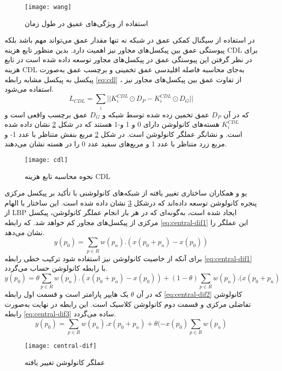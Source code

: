 \begin{figure}[h]
	\centerline{\texttt{[image: wang]}}
	\caption{استفاده از ویژگی‌های عمیق در طول زمان \cite{wang2018exploiting}}
	\label{fig:wang}
\end{figure}
در استفاده از سیگنال کمکی عمق در شبکه نه تنها مقدار عمق می‌تواند مهم باشد بلکه پیوستگی عمق بین پیکسل‌های مجاور نیز اهمیت دارد. بدین منظور تابع هزینه CDL برای در نظر گرفتن این پیوستگی عمق در پیکسل‌های مجاور توسعه داده شده است
\cite{wang2020deep,wang2018exploiting}
در تابع هزینه CDL به‌جای محاسبه فاصله اقلیدسی عمق تخمینی و برچسب عمق به‌صورت پیکسل به پیکسل مشابه رابطه
\ref{eq:cdl}
، از تفاوت عمق بین پیکسل‌های مجاور نیز استفاده می‌شود.
\begin{equation}\label{eq:cdl}
	L_{CDL} = \sum_{i}||K_i^{CDL} \odot D_P-K_i^{CDL} \odot D_G||
\end{equation}
که در آن
$D_P$
عمق تخمین زده شده توسط شبکه و
$D_G$
عمق برچسب واقعی است و
$K_i^{CDL}$
هسته‌های کانولوشن دارای 0 و 1 و-1 هستند که در شکل
\ref{fig:cdl}
نشان داده شده است. و  نشانگر عملگر کانولوشن است. در شکل
\ref{fig:cdl}
مربع بنفش متناظر با عدد 1- و مربع زرد متناظر با عدد 1 و مربع‌های سفید عدد 0 را در هسته نشان می‌دهند. 
 \begin{figure}[ht]
 	\centerline{\texttt{[image: cdl]}}
 	\caption{نحوه محاسبه تابع هزینه CDL}
 	\label{fig:cdl}
 \end{figure}
یو و همکاران
\cite{yu2020searching}
ساختاری تغییر یافته از شبکه‌های کانولوشنی با تأکید بر پیکسل مرکزی پنجره کانولوشن توسعه داده‌اند که درشکل
\ref{fig:central-dif}
نشان داده شده است.
این ساختار با الهام از LBP ایجاد شده است، به‌گونه‌ای که در هر بار انجام عملگر کانولوشن، پیکسل مرکزی از پیکسل‌های مجاور کم خواهد شد. که رابطه
\ref{eq:central-dif1}
این عملگر را نشان می‌دهد.
\begin{equation}\label{eq:central-dif1}
	y(p_0) = \sum_{p \in R} w(p_n).(x(p_0+p_n)-x(p_0)) 
\end{equation}
برای آنکه از خاصیت کانولوشن نیز استفاده شود ترکیب خطی رابطه
\ref{eq:central-dif1}
با رابطه کانولوشن حساب می‌گردد.
\begin{equation}\label{eq:central-dif2}
	y(p_0) = \theta\sum_{p \in R} w(p_n).(x(p_0+p_n)-x(p_0)) +
	(1-\theta)\sum_{p \in R}w(p_n).(x(p_0+p_n)
\end{equation}
که در آن
$\theta$
یک هایپر پارامتر است و قسمت اول رابطه
\ref{eq:central-dif2}
کانولوشن تفاضلی مرکزی و قسمت دوم کانولوشن کلاسیک است. این رابطه در نهایت به‌صورت رابطه
\ref{eq:central-dif3}
ساده می‌گردد.
\begin{equation}\label{eq:central-dif3}
	y(p_0) = \sum_{p \in R} {w(p_n).x(p_0+p_n)} +
	\theta(-x(p_0)\sum_{p \in R}{w(p_n)}
\end{equation}
\begin{figure}[h]
	\centerline{\texttt{[image: central-dif]}}
	\caption{عملگر کانولوشن تغییر یافته \cite{yu2020searching} }
	\label{fig:central-dif}
\end{figure}

